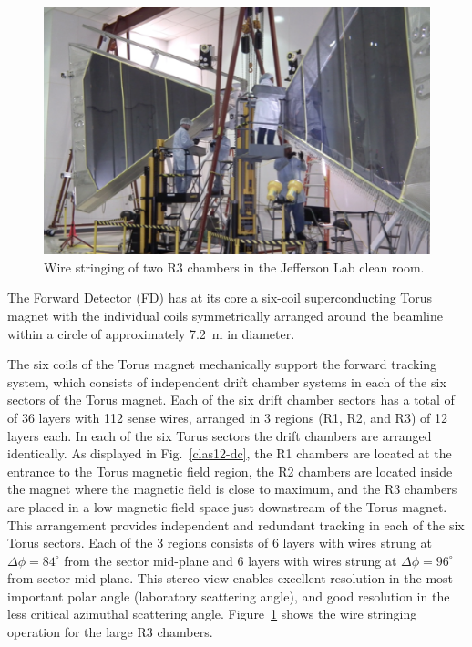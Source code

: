 \documentclass[final,3p,twocolumn]{elsarticle}
\begin{document}
\begin{figure}[htbp!]
\centerline{\includegraphics[width=1.95\columnwidth]{DC-R3.png}}
\caption{\footnotesize  Wire stringing of two R3 chambers in 
the Jefferson Lab clean room.}
\label{dc-stringing}
\end{figure}


The Forward Detector (FD) has at its core a six-coil superconducting Torus magnet with the individual coils symmetrically arranged around the beamline within a circle of approximately 7.2~m in diameter. 

The six coils of the Torus magnet mechanically support the forward tracking system, which consists of 
independent drift chamber systems in each 
of the six sectors of the Torus magnet. Each of the six drift chamber sectors has a total of of 36 layers with 112 sense wires,
 arranged in 3 regions (R1, R2, and R3) of 12 layers each. In each of the six Torus sectors the drift chambers are arranged identically. As displayed in Fig.~\ref{clas12-dc}, the R1 chambers
are located at the entrance to the Torus magnetic field region, the R2 chambers are located inside the magnet where the magnetic field is close to maximum, 
and the R3 chambers are placed in a low magnetic field space just downstream of the Torus magnet. This arrangement provides independent and redundant tracking in each of the six Torus sectors. Each of the 3 regions consists of 6 layers with wires strung at $\Delta{\phi} = 84^\circ$ from the sector mid-plane and 6 layers with wires strung at $\Delta{\phi} = 96^\circ$ from 
sector mid plane. This stereo view enables excellent resolution in the most important polar angle (laboratory scattering angle), and good resolution in the less critical azimuthal scattering angle. Figure~\ref{dc-stringing} shows the wire stringing operation
for the large R3 chambers. 
\end{document}
